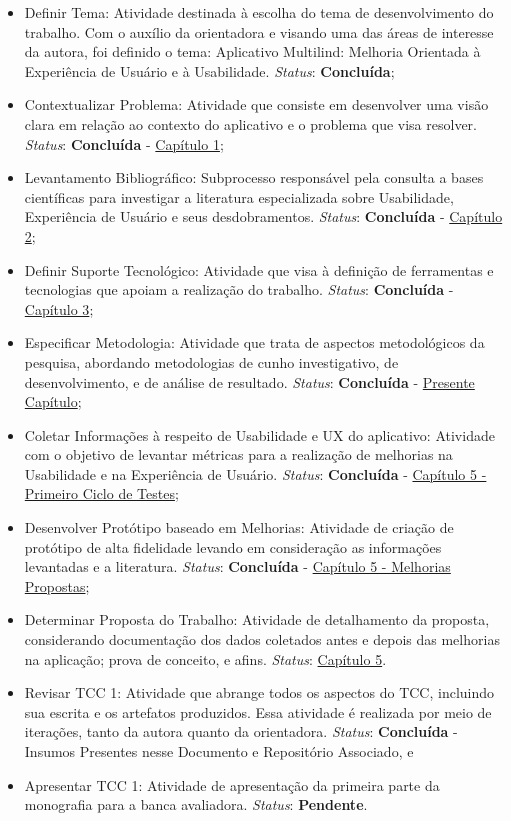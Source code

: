\begin{itemize}
	\item Definir Tema: Atividade destinada à escolha do tema de desenvolvimento do trabalho. Com o auxílio da orientadora e visando uma das áreas de interesse da autora, foi definido o tema: Aplicativo Multilind: Melhoria Orientada à
	Experiência de Usuário e à Usabilidade. \textit{Status}: \textbf{Concluída};
	\item Contextualizar Problema: Atividade que consiste em desenvolver uma visão clara em relação ao contexto do aplicativo e o problema que visa resolver. \textit{Status}: \textbf{Concluída} - \hyperref[chap:Introducao]{Capítulo 1};
	\item Levantamento Bibliográfico: Subprocesso responsável pela consulta a bases científicas para investigar a literatura especializada sobre Usabilidade, Experiência de Usuário e seus desdobramentos. \textit{Status}: \textbf{Concluída} - \hyperref[chap:Referencial]{Capítulo 2};
	\item Definir Suporte Tecnológico: Atividade que visa à definição de ferramentas e tecnologias que apoiam a realização do trabalho. \textit{Status}: \textbf{Concluída} - \hyperref[chap:ReferencialTech]{Capítulo 3};
	\item Especificar Metodologia: Atividade que trata de aspectos metodológicos da  pesquisa, abordando metodologias de cunho investigativo, de desenvolvimento, e de análise de resultado. \textit{Status}: \textbf{Concluída} - \hyperref[chap:Metodologia]{Presente Capítulo};
	\item Coletar Informações à respeito de Usabilidade e UX do aplicativo: Atividade com o objetivo de levantar métricas para a realização de melhorias na Usabilidade e na Experiência de Usuário. \textit{Status}: \textbf{Concluída} - \hyperref[sec:Primeiro Ciclo]{Capítulo 5 - Primeiro Ciclo de Testes};
	\item Desenvolver Protótipo baseado em Melhorias: Atividade de criação de protótipo de alta fidelidade levando em consideração as informações levantadas e a literatura. \textit{Status}: \textbf{Concluída} - \hyperref[sec:Melhorias Propostas]{Capítulo 5 - Melhorias Propostas};
	\item Determinar Proposta do Trabalho: Atividade de detalhamento da proposta, considerando documentação dos dados coletados antes e depois das melhorias na aplicação; prova de conceito, e afins. \textit{Status}: \hyperref[chap:Proposta]{Capítulo 5}.
	\item Revisar TCC 1: Atividade que abrange todos os aspectos do TCC, incluindo sua escrita e os artefatos produzidos. Essa atividade é realizada por meio de iterações, tanto da autora quanto da orientadora. \textit{Status}: \textbf{Concluída} -  Insumos Presentes nesse Documento e Repositório Associado, e
	\item Apresentar TCC 1: Atividade de apresentação da primeira parte da monografia para a banca avaliadora. \textit{Status}: \textbf{Pendente}.
\end{itemize}


